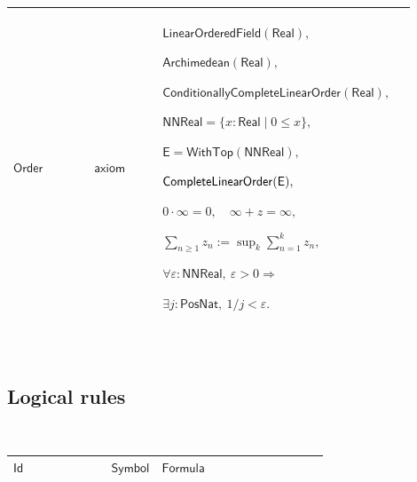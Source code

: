 \documentclass[12pt,reqno]{amsart}
\theoremstyle{blueplain}
\numberwithin{equation}{section}
\newlength{\DCTOneColumnBody}
\begin{document}
{\scriptsize \setlength{\parskip}{0pt}\nointerlineskip
\noindent 
\begin{tabular}{|@{}>{\centering\arraybackslash}m{0.19251\linewidth}|>{\centering\arraybackslash}m{0.16845\linewidth}|>{\centering\arraybackslash}m{0.53904\linewidth}|}
\hline
\hypertarget{ax:Order}{$\displaystyle \mathsf{Order}$} & $\displaystyle 
\mathsf{axiom}$ & $\displaystyle \mathsf{LinearOrderedField}(\mathsf{Real}),$%
\par$\displaystyle \mathsf{Archimedean}(\mathsf{Real}),$\par$\displaystyle 
\mathsf{ConditionallyCompleteLinearOrder}(\mathsf{Real}),$\par$\displaystyle 
\mathsf{NNReal}=\{x:\mathsf{Real}\mid0\le x\},$\par$\displaystyle \mathsf{E}=%
\mathsf{WithTop}(\mathsf{NNReal}),$\par$\displaystyle \mathsf{%
CompleteLinearOrder}(\mathsf{E}),$\par$\displaystyle 0\cdot\infty=0,\quad%
\infty+z=\infty,$\par$\displaystyle \sum_{n\ge1}z_n:=\sup_k\sum_{n=1}^kz_n,$%
\par$\displaystyle \forall\varepsilon:\mathsf{NNReal},\
\varepsilon>0\Rightarrow$\par$\displaystyle \exists j:\mathsf{PosNat},\
1/j<\varepsilon.$ \\ \hline
\end{tabular}%
}

{\scriptsize \ }

\subsection{\protect\scriptsize Logical rules}

{\scriptsize {\ }}

{\scriptsize \setlength{\parskip}{0pt}\nointerlineskip
\noindent 
\begin{tabular}{|@{}>{\centering\arraybackslash}m{\DCTOneColumnBody}|}
\hline
$\displaystyle \mathsf{Logic}$ \\ \hline
\end{tabular}%
}

{\scriptsize \setlength{\parskip}{0pt}\nointerlineskip
\noindent 
\begin{tabular}{|@{}>{\centering\arraybackslash}m{0.19251\linewidth}|>{\centering\arraybackslash}m{0.16845\linewidth}|>{\centering\arraybackslash}m{0.53904\linewidth}|}
\hline
$\displaystyle \mathsf{Id}$ & $\displaystyle \mathsf{Symbol}$ & $%
\displaystyle \mathsf{Formula}$ \\ \hline
\end{tabular}%
}
\end{document}
